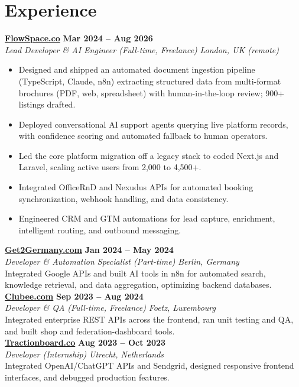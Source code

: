 \documentclass[a4paper,10pt]{article}
\newcommand{\role}[4]{%
 \textbf{#1} \hfill \textbf{#2}\\[1pt]%
 \textit{#3} \hfill \textit{#4}\\[2pt]%
}
\begin{document}
\section{Experience}

\role{\href{https://flowspace.co}{FlowSpace.co}}{Mar 2024 -- Aug 2026}{Lead Developer \& AI Engineer (Full-time, Freelance)}{London, UK (remote)}
\begin{itemize}
 \item Designed and shipped an automated document ingestion pipeline (TypeScript, Claude, n8n) extracting structured data from multi-format brochures (PDF, web, spreadsheet) with human-in-the-loop review; 900+ listings drafted.
 \item Deployed conversational AI support agents querying live platform records, with confidence scoring and automated fallback to human operators.
 \item Led the core platform migration off a legacy stack to coded Next.js and Laravel, scaling active users from 2,000 to 4,500+.
 \item Integrated OfficeRnD and Nexudus APIs for automated booking synchronization, webhook handling, and data consistency.
 \item Engineered CRM and GTM automations for lead capture, enrichment, intelligent routing, and outbound messaging.
\end{itemize}

\role{\href{https://get2germany.com}{Get2Germany.com}}{Jan 2024 -- May 2024}{Developer \& Automation Specialist (Part-time)}{Berlin, Germany}
Integrated Google APIs and built AI tools in n8n for automated search, knowledge retrieval, and data aggregation, optimizing backend databases.\\[1pt]

\role{\href{https://clubee.com}{Clubee.com}}{Sep 2023 -- Aug 2024}{Developer \& QA (Full-time, Freelance)}{Foetz, Luxembourg}
Integrated enterprise REST APIs across the frontend, ran unit testing and QA, and built shop and federation-dashboard tools.\\[1pt]

\role{\href{https://tractionboard.co}{Tractionboard.co}}{Aug 2023 -- Oct 2023}{Developer (Internship)}{Utrecht, Netherlands}
Integrated OpenAI/ChatGPT APIs and Sendgrid, designed responsive frontend interfaces, and debugged production features.

\end{document}
